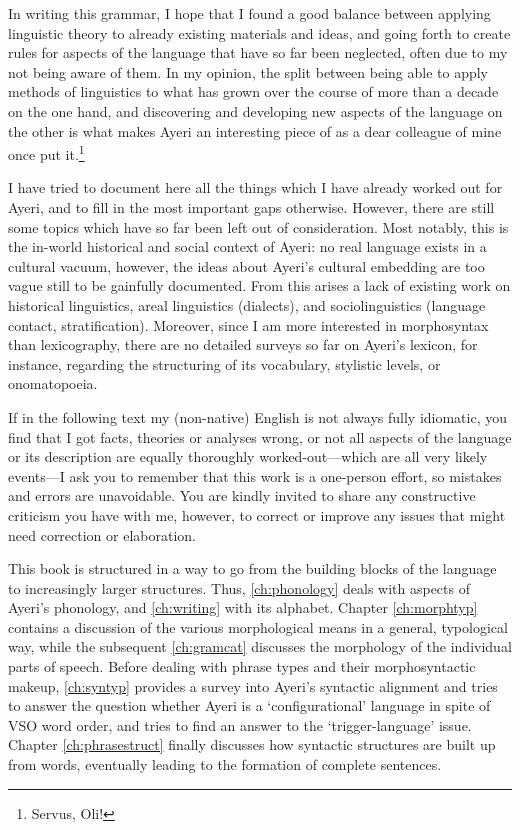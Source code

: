In writing this grammar, I hope that I found a good balance between applying
linguistic theory to already existing materials and ideas, and going forth to
create rules for aspects of the language that have so far been neglected, often
due to my not being aware of them. In my opinion, the split between being able
to apply methods of linguistics to what has grown over the course of more than
a decade on the one hand, and discovering and developing new aspects of the
language on the other is what makes Ayeri an interesting piece of
 as a dear colleague of mine once put
it.\footnote{Servus, Oli!}

I have tried to document here all the things which I have already worked out for
Ayeri, and to fill in the most important gaps otherwise. However, there are
still some topics which have so far been left out of consideration. Most
notably, this is the in-world historical and social context of Ayeri: no real
language exists in a cultural vacuum, however, the ideas about Ayeri's cultural
embedding are too vague still to be gainfully documented. From this arises a
lack of existing work on historical linguistics, areal linguistics (dialects),
and sociolinguistics (language contact, stratification). Moreover, since I am
more interested in morphosyntax than lexicography, there are no detailed surveys
so far on Ayeri's lexicon, for instance, regarding the structuring of its
vocabulary, stylistic levels, or onomatopoeia.

If in the following text my (non-native) English is not always fully idiomatic,
you find that I got facts, theories or analyses wrong, or not all aspects of
the language or its description are equally thoroughly worked-out---which are
all very likely events---I ask you to remember that this work is a one-person
effort, so mistakes and errors are unavoidable. You are kindly invited to share
any constructive criticism you have with me, however, to correct or improve any
issues that might need correction or elaboration.

This book is structured in a way to go from the building blocks of the language
to increasingly larger structures. Thus, \autoref{ch:phonology} deals with
aspects of Ayeri's phonology, and \autoref{ch:writing} with its alphabet.
Chapter \ref{ch:morphtyp} contains a discussion of the various morphological
means in a general, typological way, while the subsequent \autoref{ch:gramcat}
discusses the morphology of the individual parts of speech. Before dealing with
phrase types and their morphosyntactic makeup, \autoref{ch:syntyp} provides a
survey into Ayeri's syntactic alignment and tries to answer the question whether
Ayeri is a `configurational' language in spite of VSO word order, and tries to
find an answer to the `trigger-language' issue. Chapter \ref{ch:phrasestruct}
finally discusses how syntactic structures are built up from words, eventually
leading to the formation of complete sentences.
